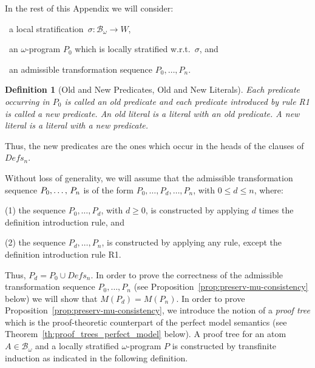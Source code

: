 \documentclass[english]{tlp}
\newtheorem{definition}{Definition} \newtheorem{example}{Example}       \newtheorem{remark}{Remark}
\renewcommand{\mathit}{\displaystyle}
\begin{document}
\medskip
In the rest of this Appendix we will consider:

\noindent
{}~a local stratification~\( \sigma:
\mathcal{B}_{\omega} \rightarrow W \), 

\noindent
{}~an $\omega$-program $P_0$ 
which is locally stratified w.r.t.~$\sigma$, and 

\noindent
{}~an
admissible transformation sequence $P_0,\ldots,P_n$. 


\begin{definition}[Old and New Predicates, Old and New Literals]
\label{def:old-new}$ $Each predicate
occurring in $P_0$ is called an {\em old predicate} and each
predicate introduced by rule {\rm{R1}} is called a {\em new
predicate}. An {\em{old literal}} is a literal with an old predicate.
A {\em{new literal}} is a literal with a new predicate.
\end{definition}

Thus, the new predicates are the ones
which occur in the heads of the clauses of $\mathit{Defs}_n$.

Without loss of generality, we will assume that the admissible
transformation sequence \( P_{0},\ldots ,$ $P_{n} \) is of the form \(
P_{0},\ldots ,P_{d},\ldots ,P_{n} \), with \( 0\! \leq \! d\! \leq
\! n \), where:

\smallskip

\noindent \textup{(1)} the sequence \( P_{0},\ldots ,P_{d} \), with
\( d\! \geq \! 0 \), is constructed by applying \( d \) times the
definition introduction rule, and

\noindent \textup{(2)} the sequence \( P_{d},\ldots ,P_{n} \), is
constructed by applying any rule, except the definition introduction
rule R1.

\smallskip{}

\noindent Thus, $P_{d} = P_{0}\cup\mathit{Defs}_n$. In order to
prove the correctness of the admissible transformation sequence
\(P_{0},\ldots ,P_{n}\) (see
Proposition~\ref{prop:preserv-mu-consistency} below) we will show that
$M(P_d)=M(P_n)$. In order to prove
Proposition~\ref{prop:preserv-mu-consistency}, we introduce
the notion of a {\em proof tree}  which is the proof-theoretic counterpart of the perfect model semantics (see
Theorem~\ref{th:proof_trees_perfect_model} below). 
A proof tree for an atom \( A
\in\mathcal{B}_{\omega} \) and a locally stratified $\omega$-program
\( P \) is constructed by transfinite induction as indicated in the
following definition.
\end{document}
